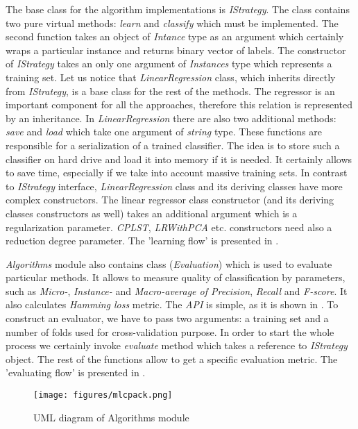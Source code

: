 The base class for the algorithm implementations is \textit{IStrategy}. The class contains two pure virtual methods: \textit{learn} and \textit{classify} which must be implemented. The second function takes an object of \textit{Intance} type as an argument which certainly wraps a particular instance and returns binary vector of labels. The constructor of \textit{IStrategy} takes an only one argument of \textit{Instances} type which represents a training set. Let us notice that \textit{LinearRegression} class, which inherits directly from \textit{IStrategy}, is a base class for the rest of the methods. The regressor is an important component for all the approaches, therefore this relation is represented by an inheritance. In \textit{LinearRegression} there are also two additional methods: \textit{save} and \textit{load} which take one argument of \textit{string} type. These functions are responsible for a serialization of a trained classifier. The idea is to store such a classifier on hard drive and load it into memory if it is needed. It certainly allows to save time, especially if we take into account massive training sets. In contrast to \textit{IStrategy} interface, \textit{LinearRegression} class and its deriving classes have more complex constructors. The linear regressor class constructor (and its deriving classes constructors as well) takes an additional argument which is a regularization parameter. \textit{CPLST}, \textit{LRWithPCA} etc. constructors need also a reduction degree parameter. The 'learning flow' is presented in .

\textit{Algorithms} module also contains class (\textit{Evaluation}) which is used to evaluate particular methods. It allows to measure quality of classification by parameters, such as \textit{Micro-}, \textit{Instance-} and \textit{Macro-average of Precision}, \textit{Recall} and \textit{F-score}. It also calculates \textit{Hamming loss} metric. The \textit{API} is simple, as it is shown in . To construct an evaluator, we have to pass two arguments: a training set and a number of folds used for cross-validation purpose. In order to start the whole process we certainly invoke \textit{evaluate} method which takes a reference to \textit{IStrategy} object. The rest of the functions allow to get a specific evaluation metric. The 'evaluating flow' is presented in .

\begin{figure}
\centering
\caption{UML diagram of Algorithms module}
\label{fig:alg_sh}
\texttt{[image: figures/mlcpack.png]}
\end{figure}

